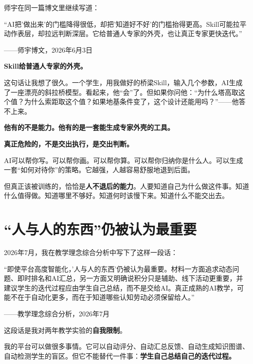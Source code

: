 师宇在同一篇博文里继续写道：

\begin{shiyu-inline}
``AI把'做出来'的门槛降得很低，却把'知道好不好'的门槛抬得更高。Skill可能拉平动作表层，却拉远判断深层。它给普通人专家的外壳，也让真正专家更快迭代。''

\hfill ——师宇博文，2026年6月3日
\end{shiyu-inline}

\textbf{Skill给普通人专家的外壳。}

这句话让我想了很久。一个学生，用我做好的桥梁Skill，输入几个参数，AI生成了一座漂亮的斜拉桥模型。看起来，他``会''了。但如果你问他：``为什么塔高取这个值？为什么索距取这个值？如果地基条件变了，这个设计还能用吗？''——他答不上来。

\textbf{他有的不是能力。他有的是一套能生成专家外壳的工具。}

\begin{insight}
\label{insight:chap10}

\textbf{真正危险的，不是交出执行，是交出判断。}

AI可以帮你写。可以帮你画。可以帮你算。可以帮你归纳你是什么人。可以生成一套``如何对待你''的策略。它越强，人越容易舒服地退到后面。

但真正该被训练的，恰恰是\textbf{人不退后的能力}。人要知道自己为什么做这件事。知道什么值得做。知道哪里不够好。知道何时该慢下来。知道什么不能交出去。
\end{insight}

\section{``人与人的东西''仍被认为最重要}

2026年7月，我在教学理念综合分析中写下了这样一段话：

\begin{shiyu-inline}
``即使平台高度智能化，'人与人的东西'仍被认为最重要。材料一方面追求动态问题、即时排名和AI汇总，另一方面又明确说积分只是辅助、线下活动更重要，并建议学生的迭代过程应由学生自己总结，而不是交给AI。真正成熟的AI教学，可能不在于自动化更多，而在于知道哪些认知劳动必须保留给人。''

\hfill ——教学理念综合分析，2026年7月
\end{shiyu-inline}

这段话是我对两年教学实验的\textbf{自我限制}。

我的平台可以做很多事情。它可以自动评分、自动汇总反馈、自动生成知识图谱、自动检测学生的盲区。但它不能替代一件事：\textbf{学生自己总结自己的迭代过程。}

